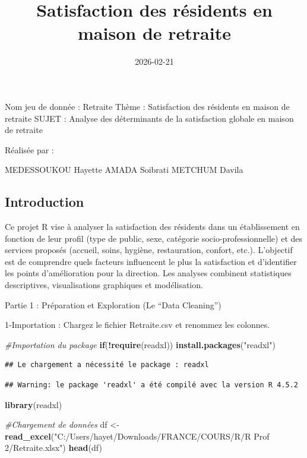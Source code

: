 \documentclass[
]{article}
\title{Satisfaction des résidents en maison de retraite}
\author{}
\date{\vspace{-2.5em}2026-02-21}
\newenvironment{Shaded}{\begin{snugshade}}{\end{snugshade}}
\newcommand{\CommentTok}[1]{\textcolor[rgb]{0.56,0.35,0.01}{\textit{#1}}}
\newcommand{\ControlFlowTok}[1]{\textcolor[rgb]{0.13,0.29,0.53}{\textbf{#1}}}
\newcommand{\FunctionTok}[1]{\textcolor[rgb]{0.13,0.29,0.53}{\textbf{#1}}}
\newcommand{\NormalTok}[1]{#1}
\newcommand{\OtherTok}[1]{\textcolor[rgb]{0.56,0.35,0.01}{#1}}
\newcommand{\SpecialCharTok}[1]{\textcolor[rgb]{0.81,0.36,0.00}{\textbf{#1}}}
\newcommand{\StringTok}[1]{\textcolor[rgb]{0.31,0.60,0.02}{#1}}
\begin{document}
\maketitle

Nom jeu de donnée : Retraite Thème : Satisfaction des résidents en
maison de retraite SUJET : Analyse des déterminants de la satisfaction
globale en maison de retraite

Réalisée par :

MEDESSOUKOU Hayette AMADA Soibrati METCHUM Davila

\subsection{Introduction}\label{introduction}

Ce projet R vise à analyser la satisfaction des résidents dans un
établissement en fonction de leur profil (type de public, sexe,
catégorie socio-professionnelle) et des services proposés (accueil,
soins, hygiène, restauration, confort, etc.). L'objectif est de
comprendre quels facteurs influencent le plus la satisfaction et
d'identifier les points d'amélioration pour la direction. Les analyses
combinent statistiques descriptives, visualisations graphiques et
modélisation.

Partie 1 : Préparation et Exploration (Le ``Data Cleaning'')

1-Importation : Chargez le fichier Retraite.csv et renommez les
colonnes.

\begin{Shaded}
\begin{Highlighting}[]
\CommentTok{\#Importation du package}
\ControlFlowTok{if}\NormalTok{(}\SpecialCharTok{!}\FunctionTok{require}\NormalTok{(readxl)) }\FunctionTok{install.packages}\NormalTok{(}\StringTok{"readxl"}\NormalTok{)}
\end{Highlighting}
\end{Shaded}

\begin{verbatim}
## Le chargement a nécessité le package : readxl
\end{verbatim}

\begin{verbatim}
## Warning: le package 'readxl' a été compilé avec la version R 4.5.2
\end{verbatim}

\begin{Shaded}
\begin{Highlighting}[]
\FunctionTok{library}\NormalTok{(readxl)}

\CommentTok{\#Chargement de données}
\NormalTok{df }\OtherTok{\textless{}{-}} \FunctionTok{read\_excel}\NormalTok{(}\StringTok{"C:/Users/hayet/Downloads/FRANCE/COURS/R/R Prof 2/Retraite.xlsx"}\NormalTok{)}
\FunctionTok{head}\NormalTok{(df)}
\end{Highlighting}
\end{Shaded}
\end{document}
